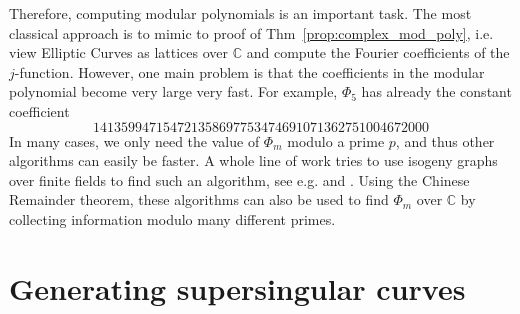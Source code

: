 \documentclass{ociamthesis}
\newcommand{\C}{\mathbb{C}}
\theoremstyle{definition}
\begin{document}
Therefore, computing modular polynomials is an important task.
The most classical approach is to mimic to proof of Thm~\ref{prop:complex_mod_poly}, i.e. view Elliptic Curves as lattices over $\C$ and compute the Fourier coefficients of the $j$-function.
However, one main problem is that the coefficients in the modular polynomial become very large very fast.
For example, $\Phi_5$ has already the constant coefficient
\begin{equation*}
    141359947154721358697753474691071362751004672000
\end{equation*}
In many cases, we only need the value of $\Phi_m$ modulo a prime $p$, and thus other algorithms can easily be faster.
A whole line of work tries to use isogeny graphs over finite fields to find such an algorithm, see e.g. \cite{compute_modular_polynomial} and \cite{compute_modular_polynomial2}.
Using the Chinese Remainder theorem, these algorithms can also be used to find $\Phi_m$ over $\C$ by collecting information modulo many different primes.

\chapter{Generating supersingular curves}



\end{document}
